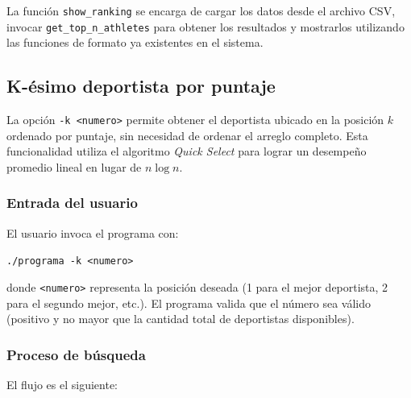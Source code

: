 La función \texttt{show\_ranking} se encarga de cargar los datos desde el archivo CSV, invocar \texttt{get\_top\_n\_athletes} para obtener los resultados y mostrarlos utilizando las funciones de formato ya existentes en el sistema.

\subsection{K-ésimo deportista por puntaje}

La opción \texttt{-k <numero>} permite obtener el deportista ubicado en la posición \(k\) ordenado por puntaje, sin necesidad de ordenar el arreglo completo. Esta funcionalidad utiliza el algoritmo \textit{Quick Select} para lograr un desempeño promedio lineal en lugar de \(n \log n\).

\subsubsection{Entrada del usuario}

El usuario invoca el programa con:

\texttt{./programa -k \textless{}numero\textgreater{}}

donde \texttt{\textless{}numero\textgreater{}} representa la posición deseada (1 para el mejor deportista, 2 para el segundo mejor, etc.). El programa valida que el número sea válido (positivo y no mayor que la cantidad total de deportistas disponibles).

\subsubsection{Proceso de búsqueda}

El flujo es el siguiente:

